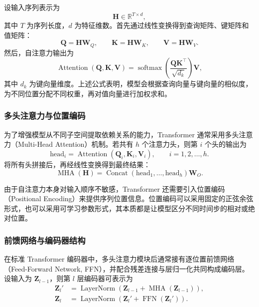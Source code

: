 \documentclass[bachelor, vlined]{DissertUESTC}
\begin{document}
    设输入序列表示为
    \begin{equation}
        \mathbf{H} \in \mathbb{R}^{T \times d},
    \end{equation}
    其中 $T$ 为序列长度，$d$ 为特征维数。首先通过线性变换得到查询矩阵、键矩阵和值矩阵：
    \begin{equation}
        \mathbf{Q} = \mathbf{H}\mathbf{W}_Q,\qquad
        \mathbf{K} = \mathbf{H}\mathbf{W}_K,\qquad
        \mathbf{V} = \mathbf{H}\mathbf{W}_V.
    \end{equation}
    然后，自注意力输出为
    \begin{equation}
        \operatorname{Attention}(\mathbf{Q}, \mathbf{K}, \mathbf{V}) =
        \operatorname{softmax}\!\left(
            \frac{\mathbf{Q}\mathbf{K}^{\top}}{\sqrt{d_k}}
        \right)\mathbf{V},
    \end{equation}
    其中 $d_k$ 为键向量维度。上述公式表明，模型会根据查询向量与键向量的相似度，为不同位置分配不同权重，再对值向量进行加权求和。

    \subsubsection{多头注意力与位置编码}
    
    为了增强模型从不同子空间提取依赖关系的能力，Transformer 通常采用多头注意力（Multi-Head Attention）机制。若共有 $h$ 个注意力头，则第 $i$ 个头的输出为
    \begin{equation}
        \mathrm{head}_i =
        \operatorname{Attention}(\mathbf{Q}_i, \mathbf{K}_i, \mathbf{V}_i),
        \qquad i=1,2,\ldots,h.
    \end{equation}
    将所有头拼接后，再经线性变换得到最终结果：
    \begin{equation}
        \operatorname{MHA}(\mathbf{H}) =
        \operatorname{Concat}(\mathrm{head}_1,\ldots,\mathrm{head}_h)\mathbf{W}_O.
    \end{equation}
    
    由于自注意力本身对输入顺序不敏感，Transformer 还需要引入位置编码（Positional Encoding）来提供序列位置信息。位置编码可以采用固定的正弦余弦形式，也可以采用可学习参数形式，其本质都是让模型区分不同时间步的相对或绝对位置。
    
    \subsubsection{前馈网络与编码器结构}
    
    在标准 Transformer 编码器中，多头注意力模块后通常接有逐位置前馈网络（Feed-Forward Network, FFN），并配合残差连接与层归一化共同构成编码层。设输入为 $\mathbf{Z}_{l-1}$，则第 $l$ 层编码器可表示为
    \begin{align}
        \mathbf{Z}_l' &= \operatorname{LayerNorm}\!\left(
            \mathbf{Z}_{l-1} + \operatorname{MHA}(\mathbf{Z}_{l-1})
        \right), \\
        \mathbf{Z}_l &= \operatorname{LayerNorm}\!\left(
            \mathbf{Z}_l' + \operatorname{FFN}(\mathbf{Z}_l')
        \right).
    \end{align}
    
\end{document}
